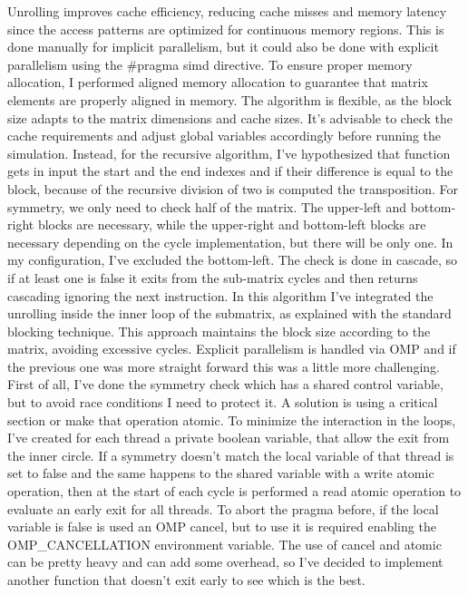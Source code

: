 Unrolling improves cache efficiency, reducing cache misses and memory latency since the access patterns are optimized for continuous memory regions. This is done manually for implicit parallelism, but it could also be done with explicit parallelism using the \#pragma simd directive. To ensure proper memory allocation, I performed aligned memory allocation to guarantee that matrix elements are properly aligned in memory.
The algorithm is flexible, as the block size adapts to the matrix dimensions and cache sizes. It’s advisable to check the cache requirements and adjust global variables accordingly before running the simulation.
Instead, for the recursive algorithm, I've hypothesized that function gets in input the start and the end indexes and if their difference is equal to the block, because of the recursive division of two is computed the transposition. For symmetry, we only need to check half of the matrix. The upper-left and bottom-right blocks are necessary, while the upper-right and bottom-left blocks are necessary depending on the cycle implementation, but there will be only one. In my configuration, I've excluded the bottom-left. The check is done in cascade, so if at least one is false it exits from the sub-matrix cycles and then returns cascading ignoring the next instruction.
In this algorithm I’ve integrated the unrolling inside the inner loop of the submatrix, as explained with the standard blocking technique. This approach maintains the block size according to the matrix, avoiding excessive cycles.
Explicit parallelism is handled via OMP and if the previous one was more straight forward this was a little more challenging. First of all, I’ve done the symmetry check which has a shared control variable, but to avoid race conditions I need to protect it. A solution is using a critical section or make that operation atomic. To minimize the interaction in the loops, I’ve created for each thread a private boolean variable, that allow the exit from the inner circle. If a symmetry doesn't match the local variable of that thread is set to false and the same happens to the shared variable with a write atomic operation, then at the start of each cycle is performed a read atomic operation to evaluate an early exit for all threads. To abort the pragma before, if the local variable is false is used an OMP cancel, but to use it is required enabling the OMP\_CANCELLATION environment variable. The use of cancel and atomic can be pretty heavy and can add some overhead, so I've decided to implement another function that doesn't exit early to see which is the best.

